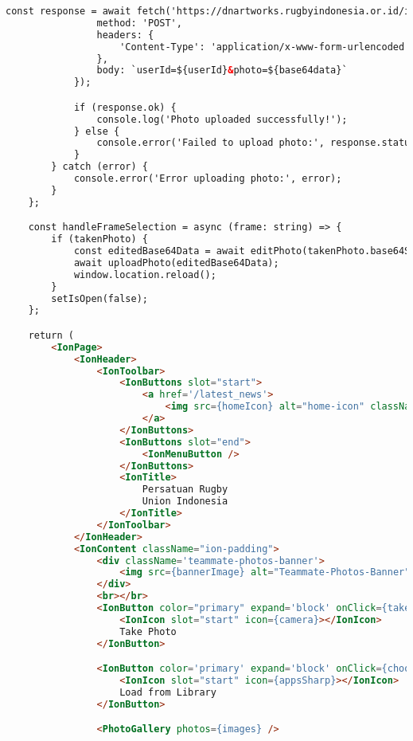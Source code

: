 \begin{lstlisting}[language=HTML, caption=teammate\_photos.tsx]
            const response = await fetch('https://dnartworks.rugbyindonesia.or.id/indonesianrugby/photos/upload.json', {
                method: 'POST',
                headers: {
                    'Content-Type': 'application/x-www-form-urlencoded'
                },
                body: `userId=${userId}&photo=${base64data}`
            });

            if (response.ok) {
                console.log('Photo uploaded successfully!');
            } else {
                console.error('Failed to upload photo:', response.statusText);
            }
        } catch (error) {
            console.error('Error uploading photo:', error);
        }
    };

    const handleFrameSelection = async (frame: string) => {
        if (takenPhoto) {
            const editedBase64Data = await editPhoto(takenPhoto.base64String!, frame);
            await uploadPhoto(editedBase64Data);
            window.location.reload();
        }
        setIsOpen(false);
    };

    return (
        <IonPage>
            <IonHeader>
                <IonToolbar>
                    <IonButtons slot="start">
                        <a href='/latest_news'>
                            <img src={homeIcon} alt="home-icon" className='home-icon' />
                        </a>
                    </IonButtons>
                    <IonButtons slot="end">
                        <IonMenuButton />
                    </IonButtons>
                    <IonTitle>
                        Persatuan Rugby
                        Union Indonesia
                    </IonTitle>
                </IonToolbar>
            </IonHeader>
            <IonContent className="ion-padding">
                <div className='teammate-photos-banner'>
                    <img src={bannerImage} alt="Teammate-Photos-Banner" />
                </div>
                <br></br>
                <IonButton color="primary" expand='block' onClick={takePicture}>
                    <IonIcon slot="start" icon={camera}></IonIcon>
                    Take Photo
                </IonButton>

                <IonButton color='primary' expand='block' onClick={choosePicture}>
                    <IonIcon slot="start" icon={appsSharp}></IonIcon>
                    Load from Library
                </IonButton>

                <PhotoGallery photos={images} />


\end{lstlisting}
